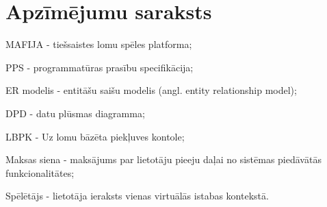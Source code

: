 \section*{Apzīmējumu saraksts}
MAFIJA - tiešsaistes lomu spēles platforma;

PPS - programmatūras prasību specifikācija;

ER modelis - entitāšu saišu modelis (angl. entity relationship model);

DPD - datu plūsmas diagramma;

LBPK - Uz lomu bāzēta piekļuves kontole;

Maksas siena - maksājums par lietotāju pieeju daļai no sistēmas piedāvātās funkcionalitātes;

Spēlētājs - lietotāja ieraksts vienas virtuālās istabas kontekstā.
